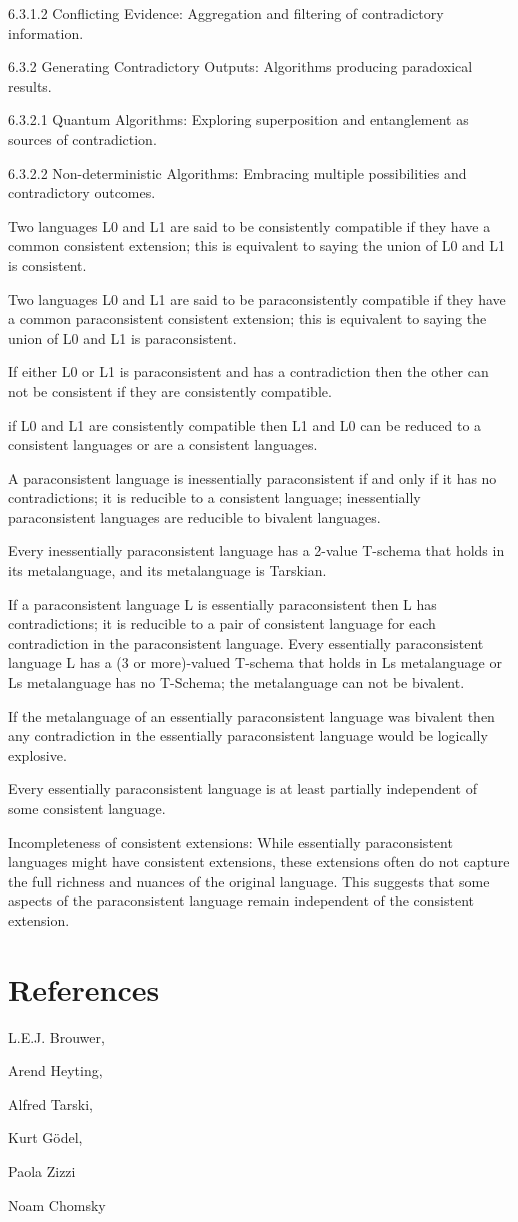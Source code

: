 6.3.1.2 Conflicting Evidence: Aggregation and filtering of contradictory
information.

6.3.2 Generating Contradictory Outputs: Algorithms producing paradoxical
results.

6.3.2.1 Quantum Algorithms: Exploring superposition and entanglement as
sources of contradiction.

6.3.2.2 Non-deterministic Algorithms: Embracing multiple possibilities
and contradictory outcomes.

Two languages L0 and L1 are said to be consistently compatible if they
have a common consistent extension; this is equivalent to saying the
union of L0 and L1 is consistent.

Two languages L0 and L1 are said to be paraconsistently compatible if
they have a common paraconsistent consistent extension; this is
equivalent to saying the union of L0 and L1 is paraconsistent.

If either L0 or L1 is paraconsistent and has a contradiction then the
other can not be consistent if they are consistently compatible.

if L0 and L1 are consistently compatible then L1 and L0 can be reduced
to a consistent languages or are a consistent languages.

A paraconsistent language is inessentially paraconsistent if and only if
it has no contradictions; it is reducible to a consistent language;
inessentially paraconsistent languages are reducible to bivalent
languages.

Every inessentially paraconsistent language has a 2-value T-schema that
holds in its metalanguage, and its metalanguage is Tarskian.

If a paraconsistent language L is essentially paraconsistent then L has
contradictions; it is reducible to a pair of consistent language for
each contradiction in the paraconsistent language. Every essentially
paraconsistent language L has a (3 or more)-valued T-schema that holds
in L\textquotesingle s metalanguage or L\textquotesingle s metalanguage
has no T-Schema; the metalanguage can not be bivalent.

If the metalanguage of an essentially paraconsistent language was
bivalent then any contradiction in the essentially paraconsistent
language would be logically explosive.

Every essentially paraconsistent language is at least partially
independent of some consistent language.

Incompleteness of consistent extensions: While essentially
paraconsistent languages might have consistent extensions, these
extensions often do not capture the full richness and nuances of the
original language. This suggests that some aspects of the paraconsistent
language remain independent of the consistent extension.

\hypertarget{references}{%
\section*{References}\label{references}}

L.E.J. Brouwer,

Arend Heyting,

Alfred Tarski,

Kurt Gödel,

Paola Zizzi

Noam Chomsky
